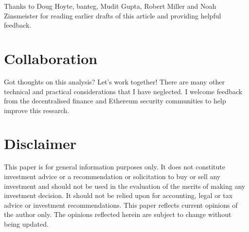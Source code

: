 \documentclass[a4paper, 11pt]{article}
\begin{document}
Thanks to Doug Hoyte, banteg, Mudit Gupta, Robert Miller and Noah Zinsmeister for reading earlier drafts of this article and providing helpful feedback. 

\section{Collaboration}

Got thoughts on this analysis? Let's work together! There are many other technical and practical considerations that I have neglected. I welcome feedback from the decentralised finance and Ethereum security communities to help improve this research.    

\section{Disclaimer}

This paper is for general information purposes only. It does not constitute investment advice or a recommendation or solicitation to buy or sell any investment and should not be used in the evaluation of the merits of making any investment decision. It should not be relied upon for accounting, legal or tax advice or investment recommendations. This paper reflects current opinions of the author only. The opinions reflected herein are subject to change without being updated.
\end{document}
